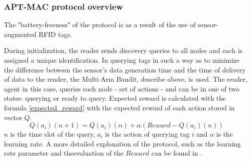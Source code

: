 \subsubsection{APT-MAC protocol overview}
The "battery-freeness" of the protocol is as a result of the use of sensor-augmented RFID tags.

During initialization, the reader sends discovery queries to all nodes and each is assigned a unique identification.
In querying tags in such a way as to minimize the difference between the sensor's data generation time and the time of delivery of data to the reader, the Multi-Arm Bandit, describe above, is used.
The reader, agent in this case, queries each node - set of actions - and can be in one of two states: querying or ready to query.
Expected reward is calculated with the formula \ref{expected_reward} with the expected reward of each action stored in vector $Q$.
\begin{equation}
    Q(a_i)(n+1) = Q(a_i)(n)+\alpha(Reward - Q(a_i)(n))
    \label{expected_reward}
\end{equation}
$n$ is the time slot of the query, $a_i$ is the action of querying tag $i$ and $\alpha$ is the learning rate.\newline
A more detailed explanation of the protocol, such as the learning rate parameter and theevaluation of the $Reward$ can be found in \cite{Maselli}.

